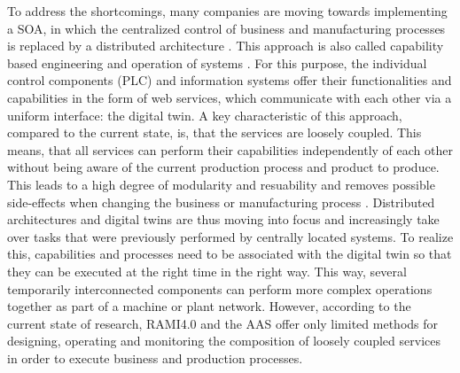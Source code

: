 To address the shortcomings, many companies are moving towards implementing a \ac{SOA}, in which the centralized control of business and manufacturing processes is replaced by a distributed architecture \cite[p.861]{Uslander2015ReferenceApproach} \cite[p.491]{Schicke2020EnablingTwins}. This approach is also called capability based engineering and operation of systems \cite[p.5]{Bayha2020DescribingComponents} \cite[p.2]{Keddis2015Capability-basedSystems}. For this purpose, the individual control components (\ac{PLC}) and information systems offer their functionalities and capabilities in the form of web services, which communicate with each other via a uniform interface: the digital twin. A key characteristic of this approach, compared to the current state, is, that the services are loosely coupled. This means, that all services can perform their capabilities independently of each other without being aware of the current production process and product to produce. This leads to a high degree of modularity and resuability and removes possible side-effects when changing the business or manufacturing process \cite[p.491]{Schicke2020EnablingTwins}. Distributed architectures and digital twins are thus moving into focus and increasingly take over tasks that were previously performed by centrally located systems. To realize this, capabilities and processes need to be associated with the digital twin so that they can be executed at the right time in the right way. This way, several temporarily interconnected components can perform more complex operations together as part of a machine or plant network. However, according to the current state of research, \ac{RAMI4.0} and the \ac{AAS} offer only limited methods for designing, operating and monitoring the composition of loosely coupled services in order to execute business and production processes. 

